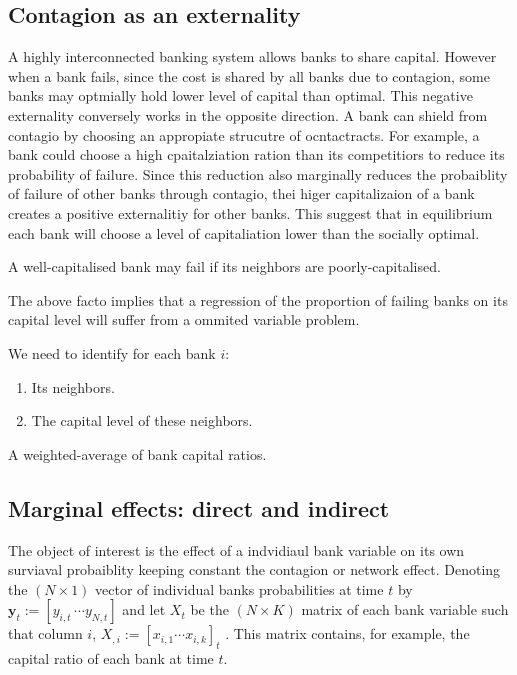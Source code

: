 \documentclass[11pt,final]{article}%
\newcommand{\vect}[1]{\bm{#1}}
\begin{document}
\subsection{Contagion as an externality}
A highly interconnected banking system allows banks to share capital. However when a bank fails, since the cost is shared by all banks due to contagion, some banks may optmially hold lower level of capital than optimal. This negative externality conversely works in the opposite direction. A bank can shield from contagio by choosing an appropiate strucutre of ocntactracts. For example, a bank could choose a high cpaitalziation ration than its competitiors to reduce its probability of failure. Since this reduction also marginally reduces the probaiblity of failure of other banks through contagio, thei higer capitalizaion of a bank creates a positive externalitiy for other banks. This suggest that in equilibrium each bank will choose a level of capitaliation  lower than the socially optimal.

A well-capitalised bank may fail if its neighbors are poorly-capitalised. 

The above facto implies that a regression of the proportion of failing banks on its capital level will suffer from a ommited variable problem.

We need to identify for each bank $i$:
\begin{enumerate}
\item Its neighbors.
\item The capital level of these neighbors. 
\end{enumerate}

A weighted-average of bank capital ratios. 
 \cite{SquartiniVanGarlaschelli2013}

\subsection{Marginal effects: direct and indirect}
The object of interest is the effect of a indvidiaul bank variable on its own surviaval probaiblity {keeping constant} the contagion or network effect. Denoting the $(N \times 1)$ vector of individual banks probabilities at time $t$ by $\vect{y}_{t} := [ y_{i,t} \, \cdots y_{N, t}]$ and let $X_{t}$ be the $(N \times K)$ matrix of each bank variable such that  column $i$, $X_{,i}:= [x_{i,1} \cdots x_{i, k}]_{t}$ . This matrix contains, for example, the capital ratio of each bank at time $t$. 
\end{document}
